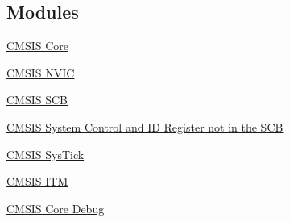 \subsection*{Modules}
\begin{DoxyCompactItemize}
\item 
\hyperlink{group___c_m_s_i_s___c_o_r_e}{C\+M\+S\+I\+S Core}
\item 
\hyperlink{group___c_m_s_i_s___n_v_i_c}{C\+M\+S\+I\+S N\+V\+IC}
\item 
\hyperlink{group___c_m_s_i_s___s_c_b}{C\+M\+S\+I\+S S\+CB}
\item 
\hyperlink{group___c_m_s_i_s___s_cn_s_c_b}{C\+M\+S\+I\+S System Control and I\+D Register not in the S\+CB}
\item 
\hyperlink{group___c_m_s_i_s___sys_tick}{C\+M\+S\+I\+S Sys\+Tick}
\item 
\hyperlink{group___c_m_s_i_s___i_t_m}{C\+M\+S\+I\+S I\+TM}
\item 
\hyperlink{group___c_m_s_i_s___core_debug}{C\+M\+S\+I\+S Core Debug}
\end{DoxyCompactItemize}
